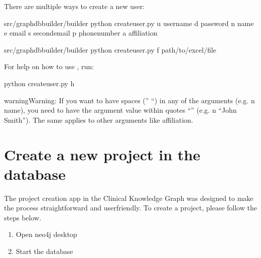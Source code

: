 \documentclass[letterpaper,10pt,english]{sphinxmanual}
\begin{document}
There are multiple ways to create a new user:

 

\begin{sphinxVerbatim}[commandchars=\\\{\}]
\PYGZdl{}  src/graphdb\PYGZus{}builder/builder
\PYGZdl{} python create\PYGZus{}user.py \PYGZhy{}u username \PYGZhy{}d password \PYGZhy{}n name \PYGZhy{}e email \PYGZhy{}s second\PYGZus{}email \PYGZhy{}p phone\PYGZus{}number \PYGZhy{}a affiliation
\end{sphinxVerbatim}

 

\begin{sphinxVerbatim}[commandchars=\\\{\}]
\PYGZdl{}  src/graphdb\PYGZus{}builder/builder
\PYGZdl{} python create\PYGZus{}user.py \PYGZhy{}f path/to/excel/file
\end{sphinxVerbatim}

For help on how to use , run:

\begin{sphinxVerbatim}[commandchars=\\\{\}]
\PYGZdl{} python create\PYGZus{}user.py \PYGZhy{}h
\end{sphinxVerbatim}

\begin{sphinxadmonition}{warning}{Warning:}
If you want to have spaces (” “) in any of the arguments (e.g. \sphinxhyphen{}n name), you need to have the argument value within quotes “” (e.g. \sphinxhyphen{}n “John Smith”). The same applies to other arguments like affiliation.
\end{sphinxadmonition}


\section{Create a new project in the database}
\label{\detokenize{getting_started/create-new-project:create-a-new-project-in-the-database}}\label{\detokenize{getting_started/create-new-project::doc}}
The project creation app in the Clinical Knowledge Graph was designed to make the process straightforward and user\sphinxhyphen{}friendly.
To create a project, please follow the steps below.

\begin{enumerate}
%
\item {} 
Open neo4j desktop

\item {} 
Start the database

\end{enumerate}
\end{document}
